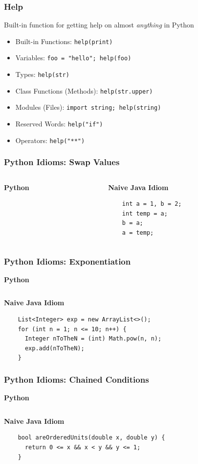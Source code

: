 \documentclass{beamer}
\begin{document}
\begin{frame}
  \frametitle{Help}
  Built-in function for getting help on almost \textit{anything} in Python
  \begin{itemize}
    \item Built-in Functions: \lstinline{help(print)}
    \item Variables: \lstinline{foo = "hello"; help(foo)}
    \item Types: \lstinline{help(str)}
    \item Class Functions (Methods): \lstinline{help(str.upper)}
    \item Modules (Files): \lstinline{import string; help(string)}
    \item Reserved Words: \lstinline{help("if")}
    \item Operators: \lstinline{help("**")}
  \end{itemize}
\end{frame}


\begin{frame}[fragile]
  \frametitle{Python Idioms: Swap Values}
  \begin{columns}
  \begin{column}{0.5\textwidth}
    \textbf{Python}
    \inputminted{python}{swap.py}
  \end{column}
  \begin{column}{0.5\textwidth}
  \textbf{Naive Java Idiom}
  \begin{lstlisting}
    int a = 1, b = 2;
    int temp = a;
    b = a;
    a = temp;
  \end{lstlisting}
  \end{column}
  \end{columns}
\end{frame}

\begin{frame}[fragile]
  \frametitle{Python Idioms: Exponentiation}
  \textbf{Python}
  \inputminted{python}{exponentiation.py}
  
  \textbf{Naive Java Idiom}
  \begin{lstlisting}
    List<Integer> exp = new ArrayList<>();
    for (int n = 1; n <= 10; n++) {
      Integer nToTheN = (int) Math.pow(n, n);
      exp.add(nToTheN);
    }
  \end{lstlisting}
\end{frame}

\begin{frame}[fragile]
  \frametitle{Python Idioms: Chained Conditions}
  \textbf{Python}
  \inputminted{python}{ordered_units.py}
  
  \textbf{Naive Java Idiom}
  \begin{lstlisting}
    bool areOrderedUnits(double x, double y) {
      return 0 <= x && x < y && y <= 1;
    }
  \end{lstlisting}
\end{frame}
\end{document}
